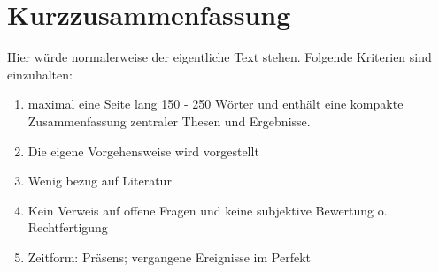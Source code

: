 \section*{Kurzzusammenfassung}\label{sec:kurzzusammenfassung}

Hier würde normalerweise der eigentliche Text stehen. Folgende Kriterien sind einzuhalten:

 \begin{enumerate}
 	\item maximal eine Seite lang 150 - 250 Wörter und enthält eine kompakte Zusammenfassung zentraler Thesen und Ergebnisse.
 	\item Die eigene Vorgehensweise wird vorgestellt
 	\item Wenig bezug auf Literatur 
 	\item Kein Verweis auf offene Fragen und keine subjektive Bewertung o. Rechtfertigung
 	\item Zeitform: Präsens; vergangene Ereignisse im Perfekt
 \end{enumerate}

\newpage